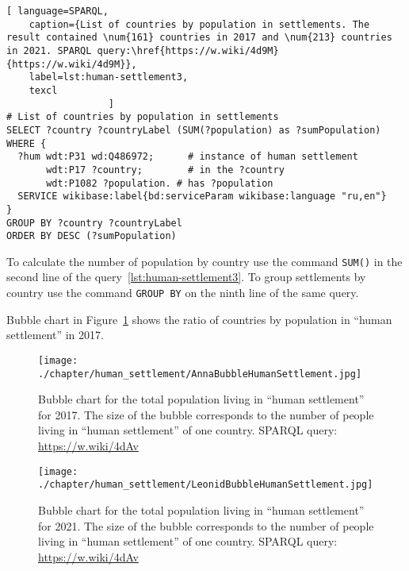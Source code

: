 \lstset{numbers=left, firstnumber=1, frame=single}
\begin{lstlisting}[ language=SPARQL, 
    caption={List of countries by population in settlements. The result contained \num{161} countries in 2017 and \num{213} countries in 2021. SPARQL query:\href{https://w.wiki/4d9M}{https://w.wiki/4d9M}},
    label=lst:human-settlement3,
    texcl 
                  ]
# List of countries by population in settlements
SELECT ?country ?countryLabel (SUM(?population) as ?sumPopulation)
WHERE {
  ?hum wdt:P31 wd:Q486972;  	# instance of human settlement
       wdt:P17 ?country;    	# in the ?country
       wdt:P1082 ?population. # has ?population
  SERVICE wikibase:label{bd:serviceParam wikibase:language "ru,en"}
}
GROUP BY ?country ?countryLabel 
ORDER BY DESC (?sumPopulation)
\end{lstlisting}%

To calculate the number of population by country
use the command \lstinline|SUM()| in the second line of the query~\ref{lst:human-settlement3}.
To group settlements by country
use the command \lstinline|GROUP BY| on the ninth line of the same query.

Bubble chart in Figure~\ref{fig:human-settlement-1}
shows the ratio of countries by population in ``human settlement'' in 2017.

\begin{figure}
\centering
	\texttt{[image: ./chapter/human\_settlement/AnnaBubbleHumanSettlement.jpg]}
	\label{fig:human-settlement-1}
    \caption[Bubble chart for the total population in ``human settlement'', 2017.] {Bubble chart for the total population living in ``human settlement'' for 2017. The size of the bubble corresponds to the number of people living in ``human settlement'' of one country. SPARQL query: \href{https://w.wiki/4dAv}{https://w.wiki/4dAv}}
\end{figure}

\begin{figure}
\centering
	\texttt{[image: ./chapter/human\_settlement/LeonidBubbleHumanSettlement.jpg]}
	\label{fig:human-settlement-2}
	\caption[Bubble chart for the total population in ``human settlement'', 2021.] {Bubble chart for the total population living in ``human settlement'' for 2021. The size of the bubble corresponds to the number of people living in ``human settlement'' of one country. SPARQL query: \href{https://w.wiki/4dAv}{https://w.wiki/4dAv}}
\end{figure}

